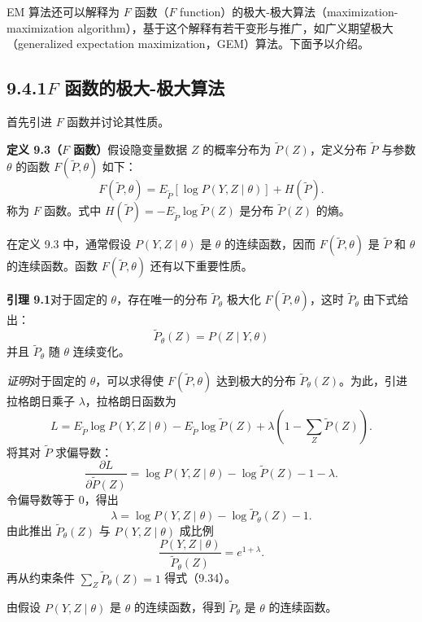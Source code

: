 \documentclass[UTF8, 12pt, fontset=fandol, oneside]{ctexart}
\begin{document}
EM 算法还可以解释为 $F$ 函数（$F$ function）的极大-极大算法（maximization-maximization algorithm），基于这个解释有若干变形与推广，如广义期望极大（generalized expectation maximization，GEM）算法。下面予以介绍。

\subsection*{9.4.1\quad $F$ 函数的极大-极大算法}

首先引进 $F$ 函数并讨论其性质。

\noindent\textbf{定义 9.3（$F$ 函数）}\quad 假设隐变量数据 $Z$ 的概率分布为 $\tilde{P}(Z)$，定义分布 $\tilde{P}$ 与参数 $\theta$ 的函数 $F(\tilde{P},\theta)$ 如下：
\begin{equation}
  F(\tilde{P},\theta)=E_{\tilde{P}}[\log P(Y,Z\mid\theta)]+H(\tilde{P}).
  \tag{9.33}
\end{equation}
称为 $F$ 函数。式中 $H(\tilde{P})=-E_{\tilde{P}}\log\tilde{P}(Z)$ 是分布 $\tilde{P}(Z)$ 的熵。

在定义 9.3 中，通常假设 $P(Y,Z\mid\theta)$ 是 $\theta$ 的连续函数，因而 $F(\tilde{P},\theta)$ 是 $\tilde{P}$ 和 $\theta$ 的连续函数。函数 $F(\tilde{P},\theta)$ 还有以下重要性质。

\noindent\textbf{引理 9.1}\quad 对于固定的 $\theta$，存在唯一的分布 $\tilde{P}_\theta$ 极大化 $F(\tilde{P},\theta)$，这时 $\tilde{P}_\theta$ 由下式给出：
\begin{equation}
  \tilde{P}_{\theta}(Z)=P(Z\mid Y,\theta)
  \tag{9.34}
\end{equation}
并且 $\tilde{P}_{\theta}$ 随 $\theta$ 连续变化。

\noindent\textit{证明}\quad 对于固定的 $\theta$，可以求得使 $F(\tilde{P},\theta)$ 达到极大的分布 $\tilde{P}_{\theta}(Z)$。为此，引进拉格朗日乘子 $\lambda$，拉格朗日函数为
\begin{equation}
  L=E_{\tilde{P}}\log P(Y,Z\mid\theta)-E_{\tilde{P}}\log\tilde{P}(Z)
  +\lambda\left(1-\sum_Z\tilde{P}(Z)\right).
  \tag{9.35}
\end{equation}
将其对 $\tilde{P}$ 求偏导数：
\[
  \frac{\partial L}{\partial\tilde{P}(Z)}
  =\log P(Y,Z\mid\theta)-\log\tilde{P}(Z)-1-\lambda.
\]
令偏导数等于 0，得出
\[
  \lambda=\log P(Y,Z\mid\theta)-\log\tilde{P}_{\theta}(Z)-1.
\]
由此推出 $\tilde{P}_{\theta}(Z)$ 与 $P(Y,Z\mid\theta)$ 成比例
\[
  \frac{P(Y,Z\mid\theta)}{\tilde{P}_{\theta}(Z)}=e^{1+\lambda}.
\]
再从约束条件 $\sum_Z\tilde{P}_{\theta}(Z)=1$ 得式（9.34）。

由假设 $P(Y,Z\mid\theta)$ 是 $\theta$ 的连续函数，得到 $\tilde{P}_{\theta}$ 是 $\theta$ 的连续函数。
\end{document}
